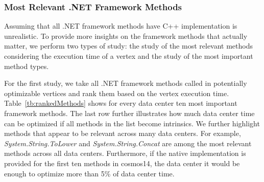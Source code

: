 \subsubsection{Most Relevant .NET Framework Methods}
Assuming that all .NET framework methods have C++ implementation is unrealistic. 
To provide more insights on the framework methods that actually matter, we perform two types of study:
the study of the most relevant methods considering the execution time of a vertex and the study of the most important method types. 

For the first study, we take all .NET framework methods called in potentially optimizable vertices and rank them based on the vertex execution time. 
Table~\ref{tb:rankedMethods} shows for every data center ten most important framework methods. 
The last row further illustrates how much data center time can be optimized if all methods in the list become intrinsics.
We further highlight methods that appear to be relevant across many data centers.
For example, \emph{System.String.ToLower} and \emph{System.String.Concat} are among the most relevant methods across all data centers.
Furthermore, if the native implementation is provided for the first ten methods in cosmos14, the data center it would be enough to optimize more than 5\% of data center time.

